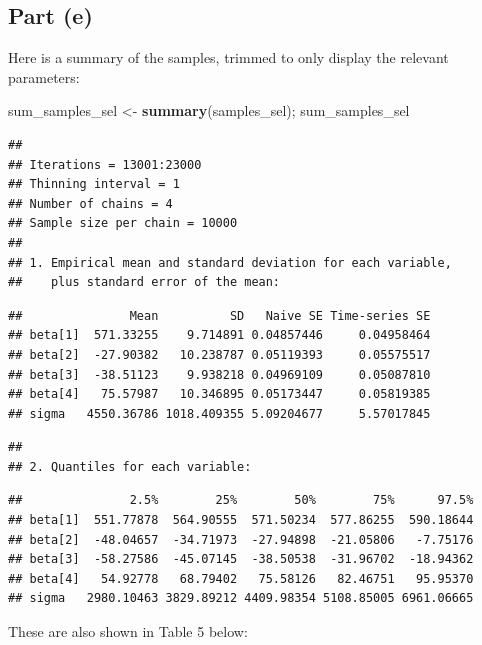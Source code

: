 \documentclass[
]{homework}
\newenvironment{Shaded}{\begin{snugshade}}{\end{snugshade}}
\newcommand{\FunctionTok}[1]{\textcolor[rgb]{0.13,0.29,0.53}{\textbf{#1}}}
\newcommand{\NormalTok}[1]{#1}
\newcommand{\OtherTok}[1]{\textcolor[rgb]{0.56,0.35,0.01}{#1}}
\begin{document}
\subsection{Part (e)}\label{part-e-1}

Here is a summary of the samples, trimmed to only display the relevant parameters:

\begin{Shaded}
\begin{Highlighting}[]
\NormalTok{sum\_samples\_sel }\OtherTok{\textless{}{-}} \FunctionTok{summary}\NormalTok{(samples\_sel); sum\_samples\_sel}
\end{Highlighting}
\end{Shaded}

\begin{verbatim}
## 
## Iterations = 13001:23000
## Thinning interval = 1
## Number of chains = 4
## Sample size per chain = 10000
## 
## 1. Empirical mean and standard deviation for each variable,
##    plus standard error of the mean:
\end{verbatim}

\begin{verbatim}
##               Mean          SD   Naive SE Time-series SE
## beta[1]  571.33255    9.714891 0.04857446     0.04958464
## beta[2]  -27.90382   10.238787 0.05119393     0.05575517
## beta[3]  -38.51123    9.938218 0.04969109     0.05087810
## beta[4]   75.57987   10.346895 0.05173447     0.05819385
## sigma   4550.36786 1018.409355 5.09204677     5.57017845
\end{verbatim}

\begin{verbatim}
## 
## 2. Quantiles for each variable:
\end{verbatim}

\begin{verbatim}
##               2.5%        25%        50%        75%      97.5%
## beta[1]  551.77878  564.90555  571.50234  577.86255  590.18644
## beta[2]  -48.04657  -34.71973  -27.94898  -21.05806   -7.75176
## beta[3]  -58.27586  -45.07145  -38.50538  -31.96702  -18.94362
## beta[4]   54.92778   68.79402   75.58126   82.46751   95.95370
## sigma   2980.10463 3829.89212 4409.98354 5108.85005 6961.06665
\end{verbatim}

These are also shown in Table 5 below:
\end{document}
